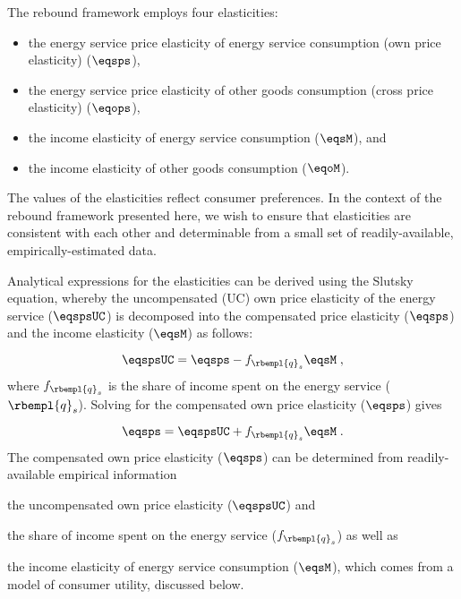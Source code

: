 

The rebound framework employs four elasticities:
%
\begin{itemize}

  \item the energy service price elasticity of energy service consumption (own price elasticity) ($\eqsps$),

  \item the energy service price elasticity of other goods consumption (cross price elasticity) ($\eqops$), 
  
  \item the income elasticity of energy service consumption ($\eqsM$), and 
  
  \item the income elasticity of other goods consumption ($\eqoM$).

\end{itemize}
%
The values of the elasticities reflect consumer preferences.
In the context of the rebound framework presented here, 
we wish to ensure that elasticities are consistent with each other
and determinable from a small set 
of readily-available, empirically-estimated data. 

Analytical expressions for the elasticities can be derived using the Slutsky equation, 
whereby the uncompensated (UC) own price elasticity 
of the energy service ($\eqspsUC$) 
is decomposed into the compensated price elasticity ($\eqsps$) and
the income elasticity ($\eqsM$) as follows:

\begin{equation}
  \eqspsUC = \eqsps - f_{\rbempl{q}_s} \eqsM \; ,
\end{equation}
%
where $f_{\rbempl{q}_s}$ is the share of income spent 
on the energy service ($\rbempl{q}_s$). 
Solving for the compensated own price elasticity ($\eqsps$) gives

\begin{equation} \label{eq:eqsps}
  \eqsps = \eqspsUC + f_{\rbempl{q}_s} \eqsM \; .
\end{equation}
%
The compensated own price elasticity ($\eqsps$)
can be determined from readily-available empirical information
%
\begin{enumerate*}[label={(\alph*)}]
	
  \item the uncompensated own price elasticity ($\eqspsUC$) and 
  
  \item the share of income spent on the energy service ($f_{\rbempl{q}_s}$)
        as well as
        
  \item the income elasticity of energy service consumption ($\eqsM$), which 
        comes from a model of consumer utility, discussed below.
    
\end{enumerate*}

